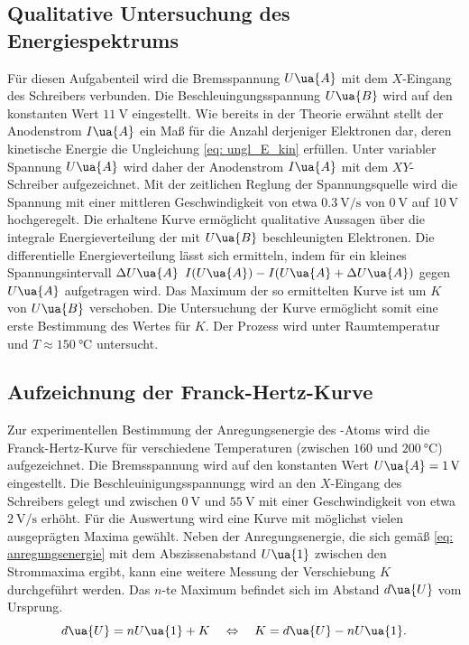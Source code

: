\subsection{Qualitative Untersuchung des Energiespektrums}
Für diesen Aufgabenteil wird die Bremsspannung $U\ua{A}$ mit dem $X$-Eingang des Schreibers verbunden. Die
Beschleuingungsspannung $U\ua{B}$ wird auf den konstanten Wert $\SI{11}{\volt}$ eingestellt.
Wie bereits
in der Theorie erwähnt stellt der Anodenstrom $I\ua{A}$ ein Maß für die Anzahl derjeniger Elektronen dar, deren %
kinetische Energie die Ungleichung \eqref{eq: ungl_E_kin} erfüllen.
Unter variabler Spannung $U\ua{A}$ wird daher der Anodenstrom $I\ua{A}$ mit dem $XY$-Schreiber aufgezeichnet.
Mit der zeitlichen Reglung der Spannungsquelle wird die Spannung mit einer mittleren Geschwindigkeit von etwa
$\SI{0.3}{\volt \per\second}$ von $\SI{0}{\volt}$ auf $\SI{10}{\volt}$ hochgeregelt. Die erhaltene Kurve ermöglicht
qualitative Aussagen über die integrale Energieverteilung der mit $U\ua{B}$ beschleunigten Elektronen.
Die differentielle Energieverteilung lässt sich ermitteln, indem für ein kleines Spannungsintervall
$\Delta U\ua{A}$ $I(U\ua{A}) - I(U\ua{A} + \Delta U\ua{A})$ gegen $U\ua{A}$ aufgetragen wird. Das Maximum
der so ermittelten Kurve ist um $K$ von $U\ua{B}$ verschoben. Die Untersuchung der Kurve ermöglicht somit eine
erste Bestimmung des Wertes für $K$.
Der Prozess wird unter Raumtemperatur und $T \approx \SI{150}{\celsius}$ untersucht.

\subsection{Aufzeichnung der Franck-Hertz-Kurve}
Zur experimentellen Bestimmung der Anregungsenergie des -Atoms wird die Franck-Hertz-Kurve für
verschiedene Temperaturen (zwischen $\num{160}$ und $\SI{200}{\celsius}$) aufgezeichnet.
Die Bremsspannung wird auf den konstanten Wert $U\ua{A} = \SI{1}{\volt}$ eingestellt.
Die Beschleuinigungsspannungg wird an den $X$-Eingang des Schreibers gelegt und zwischen $\SI{0}{\volt}$
und $\SI{55}{\volt}$ mit einer Geschwindigkeit von etwa $\SI{2}{\volt \per\second}$ erhöht. Für die
Auswertung wird eine Kurve mit möglichst vielen ausgeprägten Maxima gewählt. Neben der Anregungsenergie,
die sich gemäß \ref{eq: anregungsenergie} mit dem Abszissenabstand $U\ua{1}$ zwischen den Strommaxima ergibt,
kann eine weitere Messung der Verschiebung
$K$ durchgeführt werden. Das $n$-te Maximum befindet sich im Abstand $d\ua{U}$ vom Ursprung.
\begin{equation}
  d\ua{U} = nU\ua{1} + K \quad \Leftrightarrow \quad K = d\ua{U}- n U\ua{1}.
  \label{eq: k_franck}
\end{equation}

